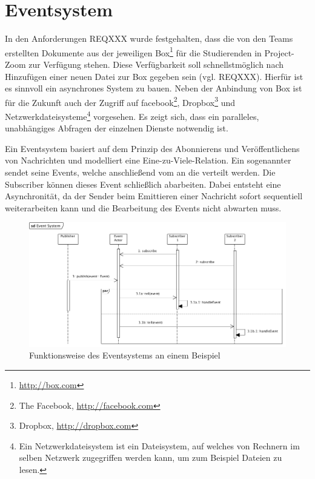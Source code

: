
\section{Eventsystem}
In den Anforderungen REQXXX wurde festgehalten, dass die von den Teams erstellten Dokumente aus der jeweiligen \gls{Box}\footnote{\url{http://box.com}} für die Studierenden in Project-Zoom zur Verfügung stehen. Diese Verfügbarkeit soll schnellstmöglich nach Hinzufügen einer neuen Datei zur \gls{Box} gegeben sein (vgl. REQXXX). Hierfür ist es sinnvoll ein asynchrones System zu bauen.  Neben der Anbindung von \gls{Box} ist für die Zukunft auch der Zugriff auf facebook\footnote{The Facebook, \url{http://facebook.com}}, Dropbox\footnote{Dropbox, \url{http://dropbox.com}} und Netzwerkdateisysteme\footnote{Ein Netzwerkdateisystem ist ein Dateisystem, auf welches von Rechnern im selben Netzwerk zugegriffen werden kann, um zum Beispiel Dateien zu lesen.} vorgesehen. Es zeigt sich, dass ein paralleles, unabhängiges Abfragen der einzelnen Dienste notwendig ist.

Ein Eventsystem basiert auf dem Prinzip des Abonnierens und Veröffentlichens von Nachrichten und modelliert eine Eine-zu-Viele-Relation. Ein sogenannter  sendet seine Events, welche anschließend vom  an die  verteilt werden. Die Subscriber können dieses Event schließlich abarbeiten. Dabei entsteht eine Asynchronität, da der Sender beim Emittieren einer Nachricht sofort sequentiell weiterarbeiten kann und die Bearbeitung des Events nicht abwarten muss.

\begin{figure}[h]  
  \centering     
  \includegraphics[width=1.0\textwidth]{img/event_system.png}  
   \caption{Funktionsweise des Eventsystems an einem Beispiel}   
  \label{fig:event-system} 
\end{figure}

